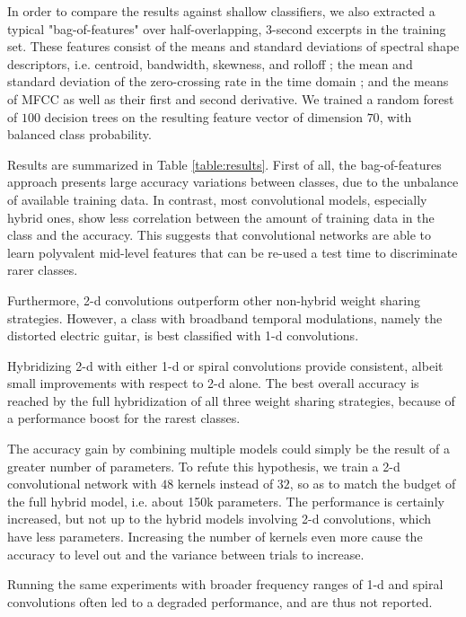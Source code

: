 \documentclass{article}
\makeatletter
\newcommand*{\ie}{i.e.\@\xspace}
\makeatother
\begin{document}
In order to compare the results against shallow classifiers, we also extracted a typical
"bag-of-features" over half-overlapping, 3-second excerpts in the training set.
These features consist of the means and standard
deviations of spectral shape descriptors, \ie centroid, bandwidth, skewness,
and rolloff ; the mean and standard deviation of the zero-crossing rate in the time domain ;
and the means of MFCC as well as their first and second derivative.
We trained a random forest of $100$ decision trees on the resulting feature vector
of dimension $70$, with balanced class probability.

Results are summarized in Table \ref{table:results}.
First of all, the bag-of-features approach presents large accuracy variations
between classes, due to the unbalance of available training data.
In contrast, most convolutional models, especially hybrid ones, show less correlation
between the amount of training data in the class and the accuracy.
This suggests that convolutional networks are able to learn polyvalent
mid-level features that can be re-used a test time to discriminate rarer classes.

Furthermore, 2-d convolutions outperform other non-hybrid
weight sharing strategies. However, a class with broadband
temporal modulations, namely the distorted electric guitar, is best classified
with 1-d convolutions.

Hybridizing 2-d with either 1-d or spiral convolutions provide consistent, albeit
small improvements with respect to 2-d alone. The best overall accuracy is reached
by the full hybridization of all three weight sharing strategies, because of a performance boost for the rarest classes.

The accuracy gain by combining multiple models could simply be the result of
a greater number of parameters. To refute this hypothesis, we train a 2-d convolutional
network with $48$ kernels instead of $32$, so as to match the budget of the full hybrid model, \ie about 150k parameters. The performance is certainly increased, but not up to the hybrid models involving 2-d convolutions, which have less parameters. Increasing the number of kernels even more cause the accuracy to level out and the
variance between trials to increase.

Running the same experiments with broader frequency ranges of 1-d and spiral convolutions often led to a degraded performance, and are thus not reported.
\end{document}
